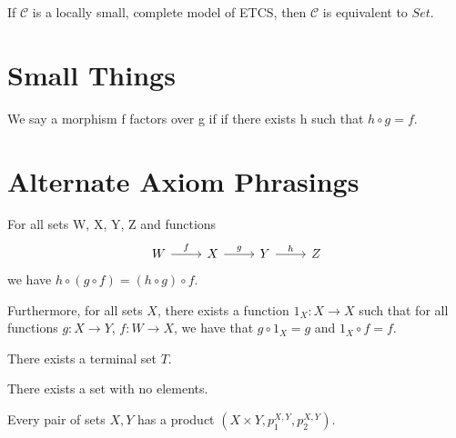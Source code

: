 \begin{theorem}
If $\mathcal{C}$ is a locally small, complete model of ETCS, then $\mathcal{C}$ is equivalent to $Set$.
\end{theorem}




\clearpage

\begin{appendix}

\section{Small Things}

\begin{remark}
We say a morphism f factors over g if if there exists h such that $h \circ g = f$.
\end{remark}


\section{Alternate Axiom Phrasings}

\setcounter{axiom}{0}


\begin{axiom}
For all sets W, X, Y, Z and functions
\begin{equation*}
\begin{tikzcd}
W \arrow[r,"f"] & X \arrow[r,"g"] & Y \arrow[r,"h"] & Z 
\end{tikzcd}
\end{equation*}
we have $h \circ (g \circ f) = (h \circ g) \circ f$. 

Furthermore, for all sets $X$, there exists a function $1_{X}: X \longrightarrow X$ such that for all functions $g: X \longrightarrow Y$, $f: W \longrightarrow X$, we have that $g \circ 1_{X} = g$ and $1_{X} \circ f = f$.
\end{axiom}

\begin{axiom}
There exists a terminal set $T$.
\end{axiom}

\begin{axiom}
There exists a set with no elements.
\end{axiom}

\begin{axiom}
Every pair of sets $X, Y$ has a product $(X \times Y, p_1^{X,Y}, p_2^{X,Y})$.
\end{axiom}


\end{appendix}
